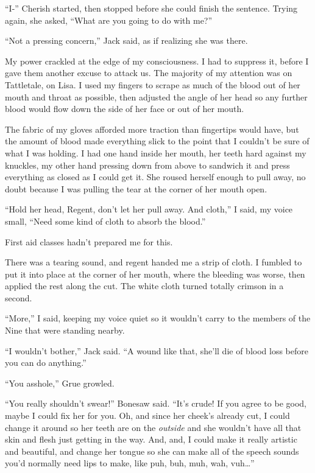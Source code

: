 ``I-'' Cherish started, then stopped before she could finish the sentence.  Trying again, she asked, ``What are you going to do with me?''



``Not a pressing concern,'' Jack said, as if realizing she was there.



My power crackled at the edge of my consciousness.  I had to suppress it, before I gave them another excuse to attack us.  The majority of my attention was on Tattletale, on Lisa. I used my fingers to scrape as much of the blood out of her mouth and throat as possible, then adjusted the angle of her head so any further blood would flow down the side of her face or out of her mouth.



The fabric of my gloves afforded more traction than fingertips would have, but the amount of blood made everything slick to the point that I couldn't be sure of what I was holding.  I had one hand inside her mouth, her teeth hard against my knuckles, my other hand pressing down from above to sandwich it and press everything as closed as I could get it.  She roused herself enough to pull away, no doubt because I was pulling the tear at the corner of her mouth open.



``Hold her head, Regent, don't let her pull away.  And cloth,'' I said, my voice small, ``Need some kind of cloth to absorb the blood.''



First aid classes hadn't prepared me for this.



There was a tearing sound, and regent handed me a strip of cloth.  I fumbled to put it into place at the corner of her mouth, where the bleeding was worse, then applied the rest along the cut.  The white cloth turned totally crimson in a second.



``More,'' I said, keeping my voice quiet so it wouldn't carry to the members of the Nine that were standing nearby.



``I wouldn't bother,'' Jack said.  ``A wound like that, she'll die of blood loss before you can do anything.''



``You asshole,'' Grue growled.



``You really shouldn't swear!'' Bonesaw said.  ``It's crude!  If you agree to be good, maybe I could fix her for you.  Oh, and since her cheek's already cut, I could change it around so her teeth are on the \emph{outside} and she wouldn't have all that skin and flesh just getting in the way.  And, and, I could make it really artistic and beautiful, and change her tongue so she can make all of the speech sounds you'd normally need lips to make, like puh, buh, muh, wah, vuh\ldots''



